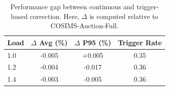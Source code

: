 \begin{table}[t]
\centering
\caption{Performance gap between continuous and trigger-based correction. Here, $\Delta$ is computed relative to COSIMS-Auction-Full.}
\label{tab:trigger_gap}
\begin{tabular}{lccc}
\toprule
Load & $\Delta$ Avg (\%) & $\Delta$ P95 (\%) & Trigger Rate \\
\midrule
1.0 & -0.005 & +0.005 & 0.35 \\
1.2 & -0.004 & -0.017 & 0.36 \\
1.4 & -0.003 & -0.005 & 0.36 \\
\bottomrule
\end{tabular}
\end{table}
